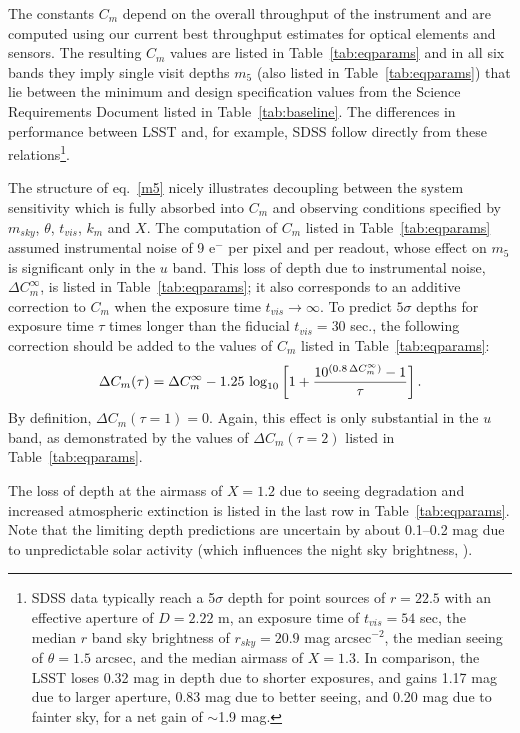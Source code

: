 The constants $C_m$ depend on the overall throughput of the instrument
and are computed using our current best throughput estimates for
optical elements and sensors. The resulting $C_m$ values are listed in Table~\ref{tab:eqparams}
and in all six bands they imply single visit depths $m_5$ (also listed
in Table~\ref{tab:eqparams}) that lie between the minimum and design
specification values from the Science Requirements
Document listed in Table~\ref{tab:baseline}.
The differences in performance between LSST and, for example, SDSS
follow directly from these relations\footnote{SDSS data
typically reach a 5$\sigma$ depth for point sources of $r=22.5$
with an effective aperture of $D=2.22$ m, an exposure time of $t_{vis}=54$
sec, the median $r$ band sky brightness of $r_{sky}=20.9$ mag arcsec$^{-2}$,
the median seeing of $\theta=1.5$ arcsec, and the median airmass of $X=1.3$.
In comparison, the LSST loses 0.32 mag in depth due to shorter exposures,
and gains 1.17 mag due to larger aperture, 0.83 mag due to better
seeing, and 0.20 mag due to fainter sky, for a net gain of $\sim$1.9 mag.}.

The structure of eq.~\ref{m5} nicely illustrates decoupling between the system
sensitivity which is fully absorbed into $C_m$ and observing conditions
specified by $m_{sky}$, $\theta$, $t_{vis}$, $k_m$
and $X$. The computation of $C_m$ listed in Table~\ref{tab:eqparams} assumed instrumental noise of
9 e$^-$ per pixel and per readout, whose effect on $m_5$ is
significant only in the $u$ band.
 This loss of depth due to instrumental noise, $\Delta C^{\infty}_m$,
is listed in Table~\ref{tab:eqparams}; it also corresponds to an additive correction to $C_m$ when the
exposure time $t_{vis} \rightarrow \infty$. To predict $5\sigma$ depths for
exposure time $\tau$ times longer than the fiducial $t_{vis} = 30$ sec., the
following correction should be added to the values of $C_m$ listed in Table~\ref{tab:eqparams}:
\begin{equation}
\label{eq:DCm}
 \Delta C_m(\tau) = \Delta C^\infty_m - 1.25\,\log_{10}\left[1 + {10^{(0.8 \, \Delta C^\infty_m)} - 1 \over \tau}  \right].
\end{equation}
By definition, $\Delta C_m(\tau=1)=0$. Again, this effect is only substantial in the $u$
band, as demonstrated by the values of $\Delta C_m(\tau = 2)$ listed in Table~\ref{tab:eqparams}.

The loss of depth at the airmass of $X=1.2$ due to seeing degradation
and increased atmospheric extinction is listed in the last row in Table~\ref{tab:eqparams}. Note
that the limiting depth predictions are uncertain by about 0.1--0.2 mag
due to unpredictable solar
activity (which influences the night sky brightness,
\citealt{2008A&A...481..575P}).




